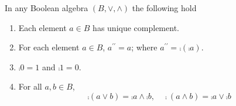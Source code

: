 \begin{theo}
    In any Boolean algebra \((B,\vee,\wedge)\) the following hold
    \begin{enumerate}
        \item[\normalfont{1.}] Each element \(a\in B\) has unique complement.

        \item[\normalfont{2.}] For each element \(a\in B\), \(a^{\prime\prime}=a\); where \(a^{\prime\prime}=\comp{(\comp{a})}\).

        \item[\normalfont{3.}] \(\comp{0}=1\) and \(\comp{1}=0\).
        
        \item[\normalfont{4.}] For all \(a,b\in B\),
        \[
        \comp{(a\vee b)}=\comp{a}\wedge\comp{b},\quad \comp{(a\wedge b)}=\comp{a}\vee\comp{b}
        \]
    \end{enumerate}
\end{theo}

